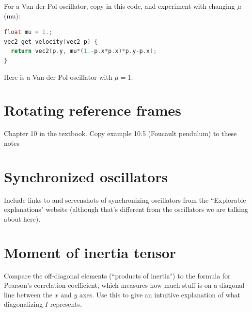 \documentclass{article}
\begin{document}
For a Van der Pol oscillator, copy in this code, and experiment with changing $\mu$ (mu):
\begin{lstlisting}[language=C,frame=single]
float mu = 1.;
vec2 get_velocity(vec2 p) {
  return vec2(p.y, mu*(1.-p.x*p.x)*p.y-p.x);
}
\end{lstlisting}
Here is a Van der Pol oscillator with $\mu = 1$:

\section{Rotating reference frames}
Chapter 10 in the textbook. Copy example 10.5 (Foucault pendulum) to these notes

\section{Synchronized oscillators}
Include links to and screenshots of synchronizing oscillators from the ``Explorable explanations" website (although that's different from the oscillators we are talking about here).

\section{Moment of inertia tensor}
Compare the off-diagonal elements (``products of inertia") to the formula for Pearson's correlation coefficient, which measures how much stuff is on a diagonal line between the $x$ and $y$ axes. Use this to give an intuitive explanation of what diagonalizing $I$ represents.
\end{document}
